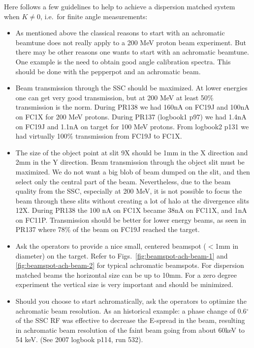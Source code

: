 \documentclass[11pt]{report}
\begin{document}
\bigskip
Here follows a few guidelines to help to achieve a dispersion matched system when $K\neq0$, i.e.~for 
finite angle measurements:
\begin{itemize}
\item As mentioned above the classical reasons to start with
      an achromatic beamtune does not really apply to a 200 MeV proton beam experiment.
      But there may be other reasons one wants to start with an achromatic beamtune.
      One example is the need to obtain good angle calibration spectra. This should be
	done with the pepperpot and an achromatic beam.
\item Beam transmission through the SSC should be maximized. At lower energies one can
      get very good transmission, but at 200 MeV at least 50\% transmission is the norm.
      During PR138 we had 160nA on FC19J and 100nA on FC1X for 200 MeV protons.
      During PR137 (logbook1 p97) we had 1.4nA on FC19J and 1.1nA on target for 100 MeV protons.
      From logbook2 p131 we had virtually 100\% transmission from FC19J to FC1X.
\item The size of the object point at slit 9X should be 1mm in the X direction and 2mm in the Y direction. 
      Beam transmission through the object slit must be maximized. We do not want a big blob of beam 
      dumped on the slit, and then select only the central part of the beam.
      Nevertheless, due to the beam quality from the SSC, especially at 200 MeV, it is not possible to focus
      the beam through these slits without creating a lot of halo at the divergence slits 12X.
      During PR138 the 100 nA on FC1X became 38nA on FC11X, and 1nA on FC11P.
      Transmission should be better for lower energy beams, as seen in PR137 where 78\% of the beam
      on FC19J reached the target.
\item Ask the operators to provide a nice small, centered beamspot ($<$1mm in diameter) on the target. 
      Refer to Figs.~\ref{fig:beamspot-ach-beam-1} and \ref{fig:beamspot-ach-beam-2} for typical 
	achromatic beamspots. For dispersion matched beams the horizontal size can be up to 10mm.
      For a zero degree experiment the vertical size is very important and should be minimized.
\item Should you choose to start achromatically, 
      ask the operators to optimize the achromatic beam resolution.
      As an historical example:
      a phase change of 0.6$^{\circ}$ of the SSC RF was effective to decrease 
      the E-spread in the beam, resulting in achromatic beam resolution
      of the faint beam going from about 60keV to 54 keV. (See 2007 logbook p114, run 532).

\end{itemize}
\end{document}
